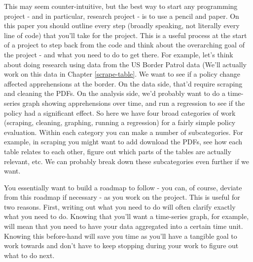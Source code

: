 \documentclass[
]{krantz}
\begin{document}
This may seem counter-intuitive, but the best way to start any programming project - and in particular, research project - is to use a pencil and paper. On this paper you should outline every step (broadly speaking, not literally every line of code) that you'll take for the project. This is a useful process at the start of a project to step back from the code and think about the overarching goal of the project - and what you need to do to get there. For example, let's think about doing research using data from the US Border Patrol data (We'll actually work on this data in Chapter \ref{scrape-table}. We want to see if a policy change affected apprehensions at the border. On the data side, that'd require scraping and cleaning the PDFs. On the analysis side, we'd probably want to do a time-series graph showing apprehensions over time, and run a regression to see if the policy had a significant effect. So here we have four broad categories of work (scraping, cleaning, graphing, running a regression) for a fairly simple policy evaluation. Within each category you can make a number of subcategories. For example, in scraping you might want to add download the PDFs, see how each table relates to each other, figure out which parts of the tables are actually relevant, etc. We can probably break down these subcategories even further if we want.

You essentially want to build a roadmap to follow - you can, of course, deviate from this roadmap if necessary - as you work on the project. This is useful for two reasons. First, writing out what you need to do will often clarify exactly what you need to do. Knowing that you'll want a time-series graph, for example, will mean that you need to have your data aggregated into a certain time unit. Knowing this before-hand will save you time as you'll have a tangible goal to work towards and don't have to keep stopping during your work to figure out what to do next.
\end{document}

